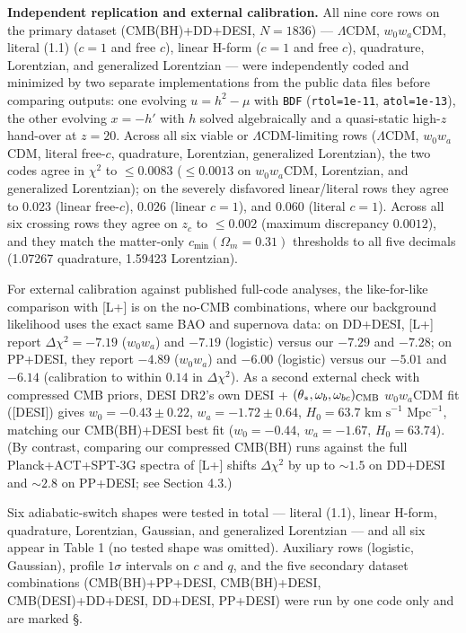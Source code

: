 \documentclass[11pt,a4paper]{article}
\begin{document}
{\bfseries\boldmath Independent replication and external calibration.} All nine core rows on the primary dataset (CMB(BH)+DD+DESI, $N = 1836$) --- $\Lambda$CDM, $w_0 w_a$CDM, literal (1.1) ($c = 1$ and free $c$), linear H-form ($c = 1$ and free $c$), quadrature, Lorentzian, and generalized Lorentzian --- were independently coded and minimized by two separate implementations from the public data files before comparing outputs: one evolving $u = h^2 - \mu$ with \texttt{BDF} (\texttt{rtol=1e-11}, \texttt{atol=1e-13}), the other evolving $x = -h'$ with $h$ solved algebraically and a quasi-static high-$z$ hand-over at $z = 20$. Across all six viable or $\Lambda$CDM-limiting rows ($\Lambda$CDM, $w_0 w_a$CDM, literal free-$c$, quadrature, Lorentzian, generalized Lorentzian), the two codes agree in $\chi^2$ to $\le 0.0083$ ($\le 0.0013$ on $w_0 w_a$CDM, Lorentzian, and generalized Lorentzian); on the severely disfavored linear/literal rows they agree to $0.023$ (linear free-$c$), $0.026$ (linear $c = 1$), and $0.060$ (literal $c = 1$). Across all six crossing rows they agree on $z_c$ to $\le 0.002$ (maximum discrepancy $0.0012$), and they match the matter-only $c_{\min}(\Omega_m = 0.31)$ thresholds to all five decimals (1.07267 quadrature, 1.59423 Lorentzian).

For external calibration against published full-code analyses, the like-for-like comparison with [L+] is on the no-CMB combinations, where our background likelihood uses the exact same BAO and supernova data: on DD+DESI, [L+] report $\Delta\chi^2 = -7.19$ ($w_0 w_a$) and $-7.19$ (logistic) versus our $-7.29$ and $-7.28$; on PP+DESI, they report $-4.89$ ($w_0 w_a$) and $-6.00$ (logistic) versus our $-5.01$ and $-6.14$ (calibration to within $0.14$ in $\Delta\chi^2$). As a second external check with compressed CMB priors, DESI DR2's own DESI + $(\theta_*, \omega_b, \omega_{bc})_{\rm CMB}$ $w_0 w_a$CDM fit ([DESI]) gives $w_0 = -0.43 \pm 0.22$, $w_a = -1.72 \pm 0.64$, $H_0 = 63.7\text{ km s}^{-1}\text{ Mpc}^{-1}$, matching our CMB(BH)+DESI best fit ($w_0 = -0.44$, $w_a = -1.67$, $H_0 = 63.74$). (By contrast, comparing our compressed CMB(BH) runs against the full Planck+ACT+SPT-3G spectra of [L+] shifts $\Delta\chi^2$ by up to $\sim 1.5$ on DD+DESI and $\sim 2.8$ on PP+DESI; see Section 4.3.)

Six adiabatic-switch shapes were tested in total --- literal (1.1), linear H-form, quadrature, Lorentzian, Gaussian, and generalized Lorentzian --- and all six appear in Table 1 (no tested shape was omitted). Auxiliary rows (logistic, Gaussian), profile $1\sigma$ intervals on $c$ and $q$, and the five secondary dataset combinations (CMB(BH)+PP+DESI, CMB(BH)+DESI, CMB(DESI)+DD+DESI, DD+DESI, PP+DESI) were run by one code only and are marked \S{}.
\end{document}
